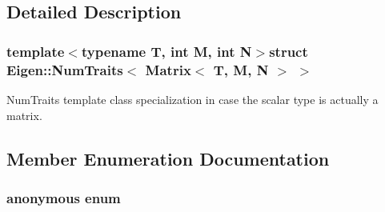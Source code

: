 \subsection{Detailed Description}
\subsubsection*{template$<$typename T, int M, int N$>$struct Eigen\-::\-Num\-Traits$<$ Matrix$<$ T, M, N $>$ $>$}

Num\-Traits template class specialization in case the scalar type is actually a matrix. 

\subsection{Member Enumeration Documentation}
\hypertarget{struct_eigen_1_1_num_traits_3_01_matrix_3_01_t_00_01_m_00_01_n_01_4_01_4_ac36f475ca5b446f4fde4c9b90bec77c8}{\subsubsection[{anonymous enum}]{\setlength{\rightskip}{0pt plus 5cm}anonymous enum}}\label{struct_eigen_1_1_num_traits_3_01_matrix_3_01_t_00_01_m_00_01_n_01_4_01_4_ac36f475ca5b446f4fde4c9b90bec77c8}
